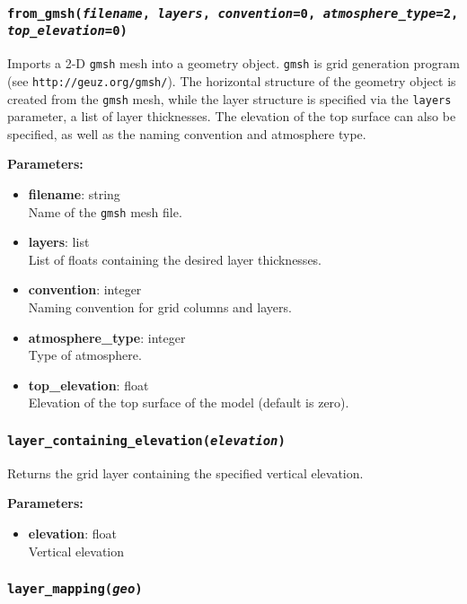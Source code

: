 \subsubsection{\texttt{from\_gmsh(\emph{filename}, \emph{layers}, \emph{convention}=0, \emph{atmosphere\_type}=2,\\
    \emph{top\_elevation}=0)}}

Imports a 2-D \texttt{gmsh} mesh into a geometry object.  \texttt{gmsh} is grid generation program (see \texttt{http://geuz.org/gmsh/}).  The horizontal structure of the geometry object is created from the \texttt{gmsh} mesh, while the layer structure is specified via the \texttt{layers} parameter, a list of layer thicknesses.  The elevation of the top surface can also be specified, as well as the naming convention and atmosphere type.

\textbf{Parameters:}
\begin{itemize}
\item \textbf{filename}: string\\
  Name of the \texttt{gmsh} mesh file.
\item \textbf{layers}: list\\
  List of floats containing the desired layer thicknesses.
\item \textbf{convention}: integer\\
  Naming convention for grid columns and layers.
\item \textbf{atmosphere\_type}: integer\\
  Type of atmosphere.
\item \textbf{top\_elevation}: float\\
  Elevation of the top surface of the model (default is zero).
\end{itemize}

\subsubsection{\texttt{layer\_containing\_elevation(\emph{elevation})}}

Returns the grid layer containing the specified vertical elevation.

\textbf{Parameters:}
\begin{itemize}
\item \textbf{elevation}: float\\
  Vertical elevation
\end{itemize}

\subsubsection{\texttt{layer\_mapping(\emph{geo})}}

